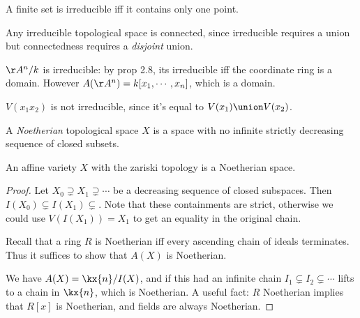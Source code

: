\begin{example}

A finite set is irreducible iff it contains only one point.

\end{example}

\begin{example}

Any irreducible topological space is connected, since irreducible
requires a union but connectedness requires a \emph{disjoint} union.

\end{example}

\begin{example}

\(\AA^n/k\) is irreducible: by prop 2.8, its irreducible iff the
coordinate ring is a domain. However \(A(\AA^n) = k[x_1, \cdots, x_n]\),
which is a domain.

\end{example}

\begin{example}

\(V(x_1 x_2)\) is not irreducible, since it's equal to
\(V(x_1) \union V(x_2)\).

\end{example}

\begin{definition}

A \emph{Noetherian} topological space \(X\) is a space with no infinite
strictly decreasing sequence of closed subsets.

\end{definition}

\begin{proposition}[?]

An affine variety \(X\) with the zariski topology is a Noetherian space.

\end{proposition}

\begin{proof}

Let \(X_0 \supsetneq X_1 \supsetneq \cdots\) be a decreasing sequence of
closed subspaces. Then \(I(X_0) \subsetneq I(X_1) \subsetneq\). Note
that these containments are strict, otherwise we could use
\(V(I(X_1)) = X_1\) to get an equality in the original chain.

Recall that a ring \(R\) is Noetherian iff every ascending chain of
ideals terminates. Thus it suffices to show that \(A(X)\) is Noetherian.

We have \(A(X) = \kx{n} / I(X)\), and if this had an infinite chain
\(I_1 \subsetneq I_2 \subsetneq \cdots\) lifts to a chain in \(\kx{n}\),
which is Noetherian. A useful fact: \(R\) Noetherian implies that
\(R[x]\) is Noetherian, and fields are always Noetherian.

\end{proof}


